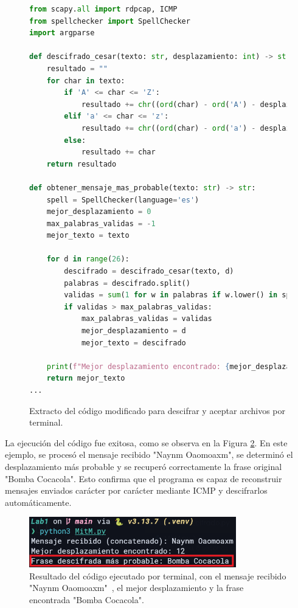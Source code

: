 \documentclass[letter,12pt]{article}
\begin{document}
\begin{figure}[H]
    \centering
    \begin{lstlisting}[language=Python]
from scapy.all import rdpcap, ICMP
from spellchecker import SpellChecker
import argparse

def descifrado_cesar(texto: str, desplazamiento: int) -> str:
    resultado = ""
    for char in texto:
        if 'A' <= char <= 'Z':
            resultado += chr((ord(char) - ord('A') - desplazamiento) % 26 + ord('A'))
        elif 'a' <= char <= 'z':
            resultado += chr((ord(char) - ord('a') - desplazamiento) % 26 + ord('a'))
        else:
            resultado += char
    return resultado

def obtener_mensaje_mas_probable(texto: str) -> str:
    spell = SpellChecker(language='es')
    mejor_desplazamiento = 0
    max_palabras_validas = -1
    mejor_texto = texto

    for d in range(26):
        descifrado = descifrado_cesar(texto, d)
        palabras = descifrado.split()
        validas = sum(1 for w in palabras if w.lower() in spell)
        if validas > max_palabras_validas:
            max_palabras_validas = validas
            mejor_desplazamiento = d
            mejor_texto = descifrado

    print(f"Mejor desplazamiento encontrado: {mejor_desplazamiento}")
    return mejor_texto
...
    \end{lstlisting}
    \caption{Extracto del código modificado para descifrar y aceptar archivos por terminal.}
    \label{ac3 codigo}
\end{figure}  

La ejecución del código fue exitosa, como se observa en la Figura \ref{ac3 codigo ejecutado}. En este ejemplo, se procesó el mensaje recibido "Naynm Oaomoaxm", se determinó el desplazamiento más probable y se recuperó correctamente la frase original "Bomba Cocacola". Esto confirma que el programa es capaz de reconstruir mensajes enviados carácter por carácter mediante ICMP y descifrarlos automáticamente.

\begin{figure}[H]
        \centering
        \includegraphics[width=9cm]{actividades/ac3/codigo_ejecutado.png}
        \caption{Resultado del código ejecutado por terminal, con el mensaje recibido "Naynm Oaomoaxm"\ , el mejor desplazamiento y la frase encontrada "Bomba Cocacola".}
        \label{ac3 codigo ejecutado}
\end{figure}
\end{document}
